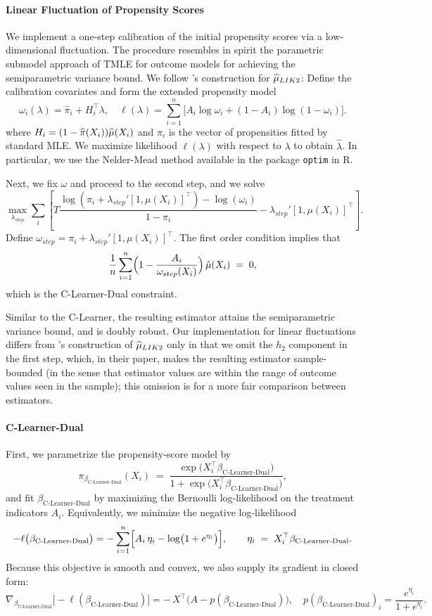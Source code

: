 \paragraph{Linear Fluctuation of Propensity Scores} We implement a one‐step calibration of the initial propensity scores via a low‐dimensional fluctuation. The procedure resembles in spirit the parametric submodel approach of TMLE for outcome models for achieving the semiparametric variance bound. We follow \cite{tan2010bounded}'s construction for $\widehat{\mu}_{LIK2}$: Define the calibration covariates and form the extended propensity model
    \[
      \omega_i(\lambda)
      = \hat\pi_i + H_i^\top\lambda,
      \quad
      \ell(\lambda)
      = \sum_{i=1}^n\bigl[A_i\log\omega_i + (1-A_i)\log(1-\omega_i)\bigr].
    \]
where $H_i=(1-\widehat{\pi}(X_i))\widehat{\mu}(X_i)$ and $\pi_i$ is the vector of propensities fitted by standard MLE. We maximize likelihood $\ell(\lambda)$ with respect to $\lambda$ to obtain $\hat\lambda$. In particular, we use the Nelder-Mead method available in the package \texttt{optim}  in R. 

Next, we fix $\omega$ and proceed to the second step, and we solve 
\[\max_{\lambda_{step}}  \sum_i \left[ T \frac{\log(\pi_i + \lambda_{step}' [1,\mu(X_i)]^\top) - \log(\omega_i)}{1-\pi_{i}} - \lambda_{step}' [1,\mu(X_i)]^\top \right].\]
Define $\omega_{step} = \pi_i + \lambda_{step}' [1,\mu(X_i)]^\top$. The first order condition implies that \[
\frac{1}{n}
\sum_{i=1}^n
\Bigl(1 - \frac{A_i}{\omega_{step}(X_i)}\Bigr)
\,\hat\mu(X_i)
\;=\;0,
\]
which is the C-Learner-Dual constraint. 

Similar to the C-Learner, the resulting estimator attains the semiparametric variance bound, and is doubly robust. Our implementation for linear fluctuations differs from \cite{tan2010bounded}'s construction of $\widehat{\mu}_{LIK2}$ only in that we omit the $h_2$ component in the first step, which, in their paper, makes the resulting estimator sample-bounded (in the sense that estimator values are within the range of outcome values seen in the sample); this omission is for a more fair comparison between estimators.



\paragraph{C-Learner-Dual} First, we parametrize the propensity‐score model by
\[
\pi_{\beta_{\text{C-Learner-Dual}}}(X_i)
\;=\;
\frac{\exp\bigl(X_i^\top \beta_{\text{C-Learner-Dual}}\bigr)}
     {1 + \exp\bigl(X_i^\top \beta_{\text{C-Learner-Dual}}\bigr)},
\]
and fit \(\beta_{\text{C-Learner-Dual}}\) by maximizing the Bernoulli log‐likelihood on the treatment indicators \(A_i\).  Equivalently, we minimize the negative log‐likelihood
\[
-\ell\bigl(\beta_{\text{C-Learner-Dual}}\bigr)
=
- \sum_{i=1}^n \Bigl[A_i\,\eta_i 
- \log\bigl(1 + e^{\eta_i}\bigr)\Bigr],
\qquad
\eta_i \;=\; X_i^\top \beta_{\text{C-Learner-Dual}}.
\]
Because this objective is smooth and convex, we also supply its gradient in closed form:
\[
\nabla_{\beta_{\text{C-Learner-Dual}}}
\bigl[-\ell(\beta_{\text{C-Learner-Dual}})\bigr]
=
-\,X^\top\bigl(A - p(\beta_{\text{C-Learner-Dual}})\bigr),
\quad
p(\beta_{\text{C-Learner-Dual}})_i
=
\frac{e^{\eta_i}}{1 + e^{\eta_i}}.
\]

